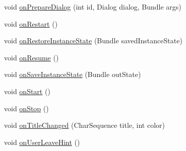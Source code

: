 \begin{DoxyCompactItemize}
void \hyperlink{classorg_1_1qtproject_1_1qt5_1_1android_1_1bindings_1_1_qt_activity_aa4466dc136a61b68aaf83cf3a5a9827d}{on\-Prepare\-Dialog} (int id, Dialog dialog, Bundle args)
\item 
void \hyperlink{classorg_1_1qtproject_1_1qt5_1_1android_1_1bindings_1_1_qt_activity_a05a1cabee75d99161959de7575052b73}{on\-Restart} ()
\item 
void \hyperlink{classorg_1_1qtproject_1_1qt5_1_1android_1_1bindings_1_1_qt_activity_a0dd64ece074eb6909bb384a63105083b}{on\-Restore\-Instance\-State} (Bundle saved\-Instance\-State)
\item 
void \hyperlink{classorg_1_1qtproject_1_1qt5_1_1android_1_1bindings_1_1_qt_activity_a136a4d6d46f5a88c6e2b9866fa78fc64}{on\-Resume} ()
\item 
void \hyperlink{classorg_1_1qtproject_1_1qt5_1_1android_1_1bindings_1_1_qt_activity_ab32e70bfe633f137c58c82a96bf68f8f}{on\-Save\-Instance\-State} (Bundle out\-State)
\item 
void \hyperlink{classorg_1_1qtproject_1_1qt5_1_1android_1_1bindings_1_1_qt_activity_a5d86c0f23d31274741575dbf916814d1}{on\-Start} ()
\item 
void \hyperlink{classorg_1_1qtproject_1_1qt5_1_1android_1_1bindings_1_1_qt_activity_a2fa87ac6c9b33749654fb05211d7d894}{on\-Stop} ()
\item 
void \hyperlink{classorg_1_1qtproject_1_1qt5_1_1android_1_1bindings_1_1_qt_activity_ab084cdaffe2c7638d6c7e1255aecec3c}{on\-Title\-Changed} (Char\-Sequence title, int color)
\item 
void \hyperlink{classorg_1_1qtproject_1_1qt5_1_1android_1_1bindings_1_1_qt_activity_a86f980854e12f7cf5c8a91f7cbd875d7}{on\-User\-Leave\-Hint} ()
\end{DoxyCompactItemize}
